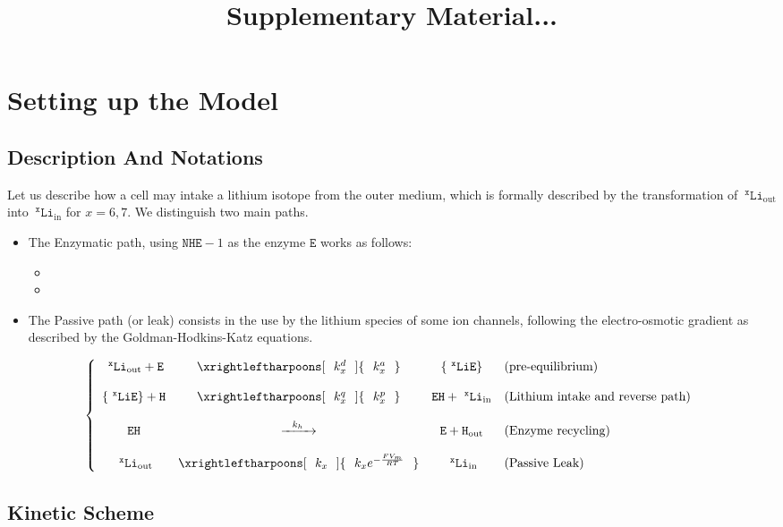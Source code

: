 \documentclass[aps,onecolumn,10pt]{revtex4}
\newcommand{\mychem}[1]{\mathtt{#1}}
\newcommand{\spLi}[1]{{~^{\mychem{#1}}\mychem{Li}}}
\newcommand{\spEout}{\mychem{E}}
\newcommand{\spLiE}[1]{\left\lbrace\spLi{#1}\spEout\right\rbrace}
\newcommand{\spLiIn}[1]{{\spLi{#1}}_{\mathrm{in}}}
\newcommand{\spLiOut}[1]{{\spLi{#1}}_{\mathrm{out}}}
\newcommand{\spEHin}{\mychem{EH}}
\newcommand{\spproton}{\mychem{H}}
\newcommand{\NHE}[1]{\mychem{NHE}{\!-\!#1}}
\begin{document}
\title{Supplementary Material...}
\maketitle

\section{Setting up the Model}

\subsection{Description And Notations}
Let us describe how a cell may intake a lithium isotope from the outer medium, which is formally described by the transformation
of $\spLiOut{x}$ into $\spLiIn{x}$ for $x=6,7$. We distinguish two main paths.

\begin{itemize}
\item The Enzymatic path, using $\NHE{1}$ as the enzyme $\spEout$ works as follows:
	\begin{itemize}
	\item
	\item
	\end{itemize}

\item The Passive path (or leak) consists in the use by the lithium species of some ion channels, following the electro-osmotic gradient as described by the Goldman-Hodkins-Katz equations. 

\end{itemize}

\begin{equation}
\left\lbrace
\begin{array}{cccl}
\spLiOut{x} + \spEout & \xrightleftharpoons[~~k^d_x~~]{~~k^a_x~~} & \spLiE{x} & (\text{pre-equilibrium})\\
\\
\spLiE{x} + \spproton & \xrightleftharpoons[~~k^q_x~~]{~~k^p_x~~} & \spEHin + \spLiIn{x} & (\text{Lithium intake and reverse path})\\
\\
\spEHin               & \xrightarrow{~~k_h~~} & \spEout + \spproton_{\mathrm{out}} & (\text{Enzyme recycling})\\
\\
\spLiOut{x}           & \xrightleftharpoons[~~k_x~~]{~~k_x e^{-\frac{FV_m}{RT}}~~} & \spLiIn{x} & (\text{Passive Leak})\\
\end{array}
\right.
\end{equation}

\subsection{Kinetic Scheme}
\end{document}

